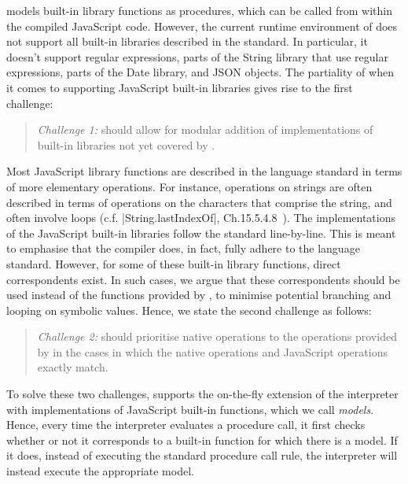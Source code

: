 \JSComp models built-in library functions as \jsil procedures, which can be called from within the compiled JavaScript code. However, the current runtime environment of \JSComp does not support all built-in libraries described in the standard. In particular, it doesn't support regular expressions, parts of the String library that use regular expressions, parts of the Date library, and JSON objects. The partiality of \JSComp when it comes to supporting JavaScript built-in libraries 
gives rise to the first challenge:  
\begin{quote}
\emph{Challenge 1:} \jilette should allow for modular addition of  
implementations of built-in libraries not yet covered by \JSComp.  
\end{quote}

Most JavaScript library functions are described in the language standard in terms of 
more elementary operations. For instance, operations on strings are often described in terms 
of operations on the characters that comprise the string, and often involve loops (c.f. \jsinline|String.lastIndexOf|, Ch.15.5.4.8~\cite{ecma}).
The \jsil implementations of the JavaScript built-in libraries follow the standard line-by-line. 
This is meant to emphasise that the compiler does, in fact, fully adhere to the language standard. 
However, for some of these built-in library functions, direct \rosette correspondents exist. 
%
In such cases, we argue that these correspondents should be used instead of the 
functions provided by \JSComp, to minimise potential branching and looping on symbolic values. 
Hence, we state the second challenge as follows: 
\begin{quote}
\emph{Challenge 2:} \jilette should prioritise native \rosette operations
to the operations provided by \JSComp in the cases in which the native \rosette
operations and JavaScript operations exactly match.
\end{quote}

To solve these two challenges, \jilette supports the on-the-fly extension of the \jsil interpreter 
with \rosette implementations of JavaScript built-in functions, which we call \rosette \emph{models}. 
Hence, every time the interpreter evaluates a procedure call, it first checks whether or 
not it corresponds to a built-in function for which there is a \rosette model. If it does, 
instead of executing the standard procedure call rule, the interpreter will instead 
execute the appropriate \rosette model. 

